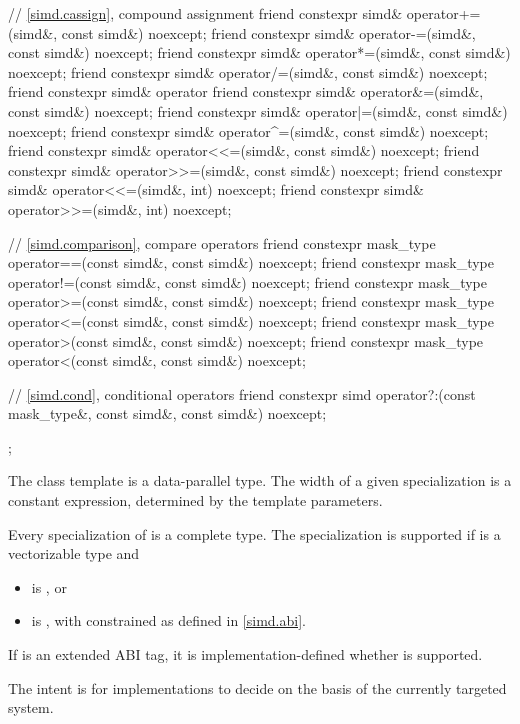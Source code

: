 \begin{codeblock}
{  // \ref{simd.cassign},  compound assignment
  friend constexpr simd& operator+=(simd&, const simd&) noexcept;
  friend constexpr simd& operator-=(simd&, const simd&) noexcept;
  friend constexpr simd& operator*=(simd&, const simd&) noexcept;
  friend constexpr simd& operator/=(simd&, const simd&) noexcept;
  friend constexpr simd& operator%
  friend constexpr simd& operator&=(simd&, const simd&) noexcept;
  friend constexpr simd& operator|=(simd&, const simd&) noexcept;
  friend constexpr simd& operator^=(simd&, const simd&) noexcept;
  friend constexpr simd& operator<<=(simd&, const simd&) noexcept;
  friend constexpr simd& operator>>=(simd&, const simd&) noexcept;
  friend constexpr simd& operator<<=(simd&, int) noexcept;
  friend constexpr simd& operator>>=(simd&, int) noexcept;

  // \ref{simd.comparison},  compare operators
  friend constexpr mask_type operator==(const simd&, const simd&) noexcept;
  friend constexpr mask_type operator!=(const simd&, const simd&) noexcept;
  friend constexpr mask_type operator>=(const simd&, const simd&) noexcept;
  friend constexpr mask_type operator<=(const simd&, const simd&) noexcept;
  friend constexpr mask_type operator>(const simd&, const simd&) noexcept;
  friend constexpr mask_type operator<(const simd&, const simd&) noexcept;

  // \ref{simd.cond},  conditional operators
  friend constexpr simd operator?:(const mask_type&, const simd&, const simd&) noexcept;
};
\end{codeblock}

\pnum
The class template  is a data-parallel type. The width of a given  specialization is a constant expression, determined by the template parameters.

\pnum
Every specialization of  is a complete type. The specialization  is supported if  is a vectorizable type and
\begin{itemize}
  \item {} is , or
  \item {} is , with  constrained as defined in \ref{simd.abi}.
\end{itemize}

If  is an extended ABI tag, it is implementation-defined whether  is supported. \begin{note}The intent is for implementations to decide on the basis of the currently targeted system.\end{note}

